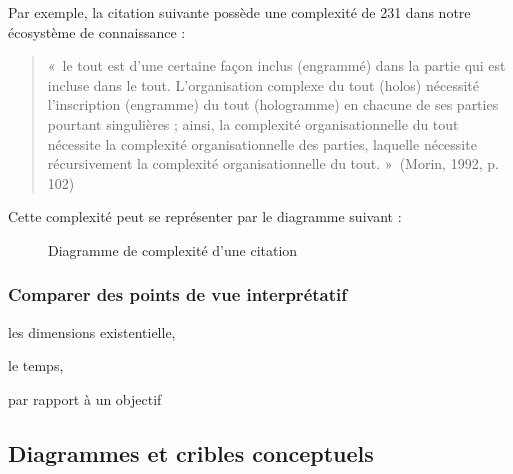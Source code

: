 \documentclass[
  a4paper,
  DIV=11,
  numbers=noendperiod]{scrreprt}
\begin{document}
Par exemple, la citation suivante possède une complexité de 231 dans
notre écosystème de connaissance :

\begin{quote}
«~le tout est d'une certaine façon inclus (engrammé) dans la partie qui
est incluse dans le tout. L'organisation complexe du tout (holos)
nécessité l'inscription (engramme) du tout (hologramme) en chacune de
ses parties pourtant singulières ; ainsi, la complexité
organisationnelle du tout nécessite la complexité organisationnelle des
parties, laquelle nécessite récursivement la complexité
organisationnelle du tout. »~(Morin, 1992, p. 102)
\end{quote}

Cette complexité peut se représenter par le diagramme suivant :

\begin{figure}


\caption{\label{fig-ComplexityCita}Diagramme de complexité d'une
citation}

\end{figure}%

\subsubsection{Comparer des points de vue
interprétatif}\label{comparer-des-points-de-vue-interpruxe9tatif}

les dimensions existentielle,

le temps,

par rapport à un objectif

\subsection{Diagrammes et cribles
conceptuels}\label{sec-diagrammesCribles}
\end{document}
